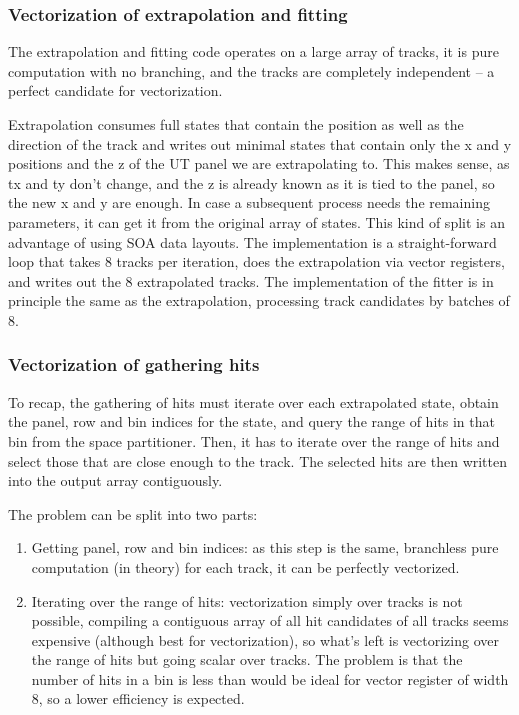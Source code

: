 \documentclass[12pt]{article}
\begin{document}
\subsubsection{Vectorization of extrapolation and fitting}\label{sec_velout_vectorize_extrap_fit}

The extrapolation and fitting code operates on a large array of tracks, it is pure computation with no branching, and the tracks are completely independent -- a perfect candidate for vectorization.

Extrapolation consumes full states that contain the position as well as the direction of the track and writes out minimal states that contain only the x and y positions and the z of the UT panel we are extrapolating to. This makes sense, as tx and ty don't change, and the z is already known as it is tied to the panel, so the new x and y are enough. In case a subsequent process needs the remaining parameters, it can get it from the original array of states. This kind of split is an advantage of using SOA data layouts. The implementation is a straight-forward loop that takes 8 tracks per iteration, does the extrapolation via vector registers, and writes out the 8 extrapolated tracks. The implementation of the fitter is in principle the same as the extrapolation, processing track candidates by batches of 8.


\subsubsection{Vectorization of gathering hits}\label{sec_velout_vectorize_gathering_hits}

To recap, the gathering of hits must iterate over each extrapolated state, obtain the panel, row and bin indices for the state, and query the range of hits in that bin from the space partitioner. Then, it has to iterate over the range of hits and select those that are close enough to the track. The selected hits are then written into the output array contiguously.

The problem can be split into two parts:
\begin{enumerate}
	\item Getting panel, row and bin indices: as this step is the same, branchless pure computation (in theory) for each track, it can be perfectly vectorized.
	\item Iterating over the range of hits: vectorization simply over tracks is not possible, compiling a contiguous array of all hit candidates of all tracks seems expensive (although best for vectorization), so what's left is vectorizing over the range of hits but going scalar over tracks. The problem is that the number of hits in a bin is less than would be ideal for vector register of width 8, so a lower efficiency is expected.
\end{enumerate}
\end{document}

